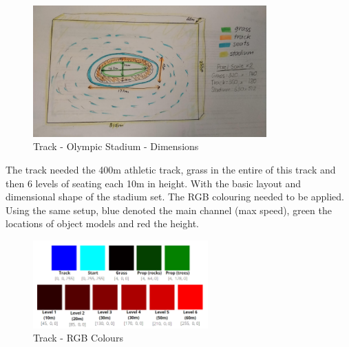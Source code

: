 \documentclass[a4 paper, 12pt]{article}
\begin{document}
\begin{figure} [H]
    \centering
    \includegraphics[width=0.8\textwidth, frame]
        {./images/olympics/track_dimensions.jpg}  
    \caption{Track - Olympic Stadium - Dimensions}   
\end{figure}

The track needed the 400m athletic track, grass in the entire of this track and then 6 levels of seating each 10m in height. With the basic layout and dimensional shape of the stadium set. The RGB colouring needed to be applied. Using the same setup, blue denoted the main channel (max speed), green the locations of object models and red the height.
    \begin{figure} [H]
        \centering
        \includegraphics[width=0.6\textwidth, frame]
            {./images/olympics/track_colours.PNG}  
        \caption{Track - RGB Colours}   
    \end{figure}
\end{document}
